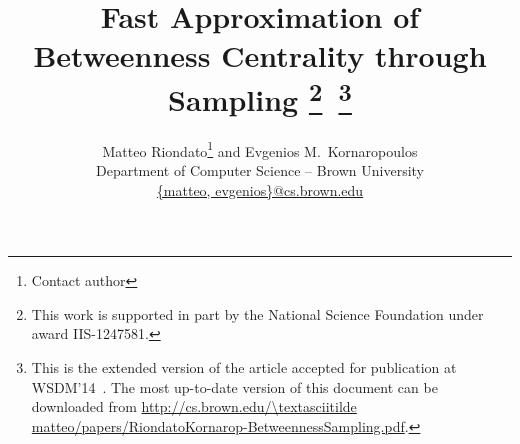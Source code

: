\documentclass[10pt]{article}
\theoremstyle{definition}
\begin{document}
\title{Fast Approximation of Betweenness Centrality through Sampling
\thanks{This work is supported in part by the National Science Foundation under
award IIS-1247581.}\ \footnote{This is the extended version of the article
accepted for publication at WSDM'14~\citep{RiondatoK14WSDM}. The most up-to-date
version of this document can be downloaded from
\protect\url{http://cs.brown.edu/\textasciitilde
matteo/papers/RiondatoKornarop-BetweennessSampling.pdf}.}}
\author{Matteo Riondato\footnote{Contact author} and Evgenios M.~Kornaropoulos\\
Department of Computer Science -- Brown University \\
\url{{matteo, evgenios}@cs.brown.edu}}
\maketitle













\end{document}
